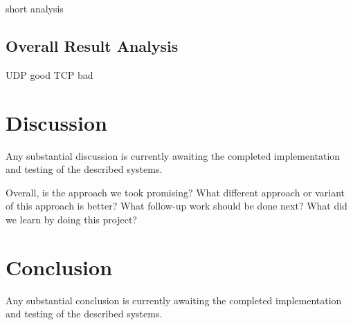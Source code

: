 \documentclass[accepted,single]{gipaper}
\begin{document}
short analysis

\subsection{Overall Result Analysis}
\label{result_analysis}

UDP good
TCP bad


\section{Discussion}
\label{discussion}

Any substantial discussion is currently awaiting the completed implementation and testing of the described systems.

Overall, is the approach we took promising?
What different approach or variant of this approach is better?
What follow-up work should be done next?
What did we learn by doing this project?

\section{Conclusion}
\label{conclusion}

Any substantial conclusion is currently awaiting the completed implementation and testing of the described systems.


\end{document}
